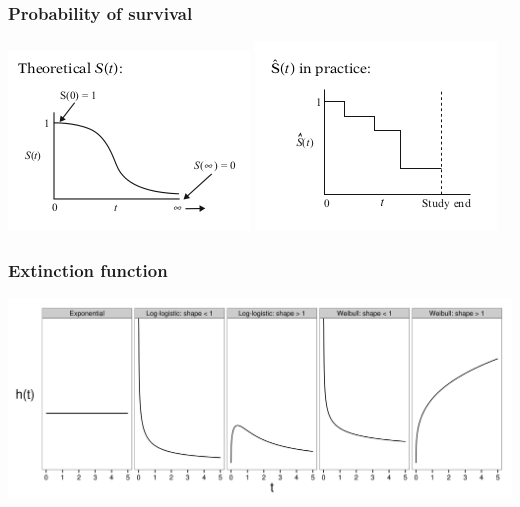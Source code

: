 \documentclass{beamer}
\begin{document}
\begin{frame}
  \frametitle{Probability of survival}
  \includegraphics[height = 0.4\textheight, width = \textwidth, keepaspectratio = true]{figure/ideal}
  \includegraphics[height = 0.4\textheight, width = \textwidth, keepaspectratio = true]{figure/prac}

  \tiny{}
\end{frame}

\begin{frame}
  \frametitle{Extinction function}

  \begin{center}
    \includegraphics[width = \textwidth, keepaspectratio = true]{figure/hazard}
  \end{center}

\end{frame}
\end{document}
